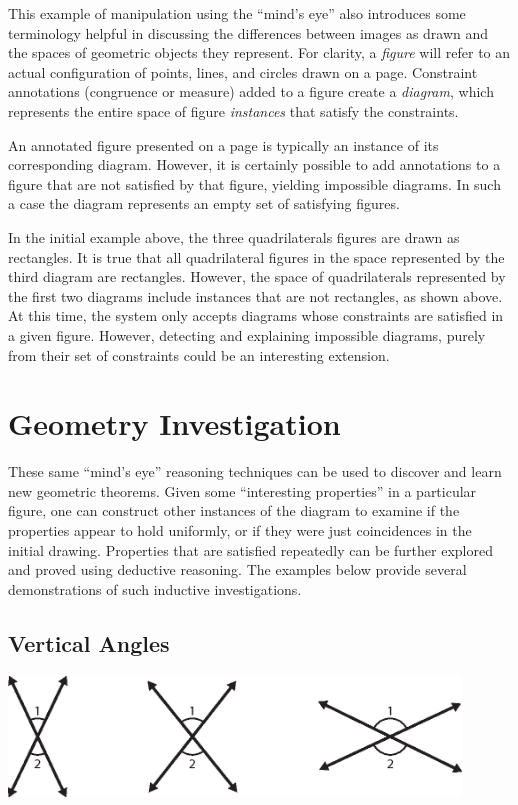 This example of manipulation using the ``mind's eye'' also introduces
some terminology helpful in discussing the differences between images
as drawn and the spaces of geometric objects they represent.  For
clarity, a \emph{figure} will refer to an actual configuration of
points, lines, and circles drawn on a page.  Constraint annotations
(congruence or measure) added to a figure create a \emph{diagram},
which represents the entire space of figure \emph{instances} that
satisfy the constraints.

An annotated figure presented on a page is typically an instance of
its corresponding diagram.  However, it is certainly possible to add
annotations to a figure that are not satisfied by that figure,
yielding impossible diagrams.  In such a case the diagram represents
an empty set of satisfying figures.

In the initial example above, the three quadrilaterals figures are
drawn as rectangles.  It is true that all quadrilateral figures in the
space represented by the third diagram are rectangles.  However, the
space of quadrilaterals represented by the first two diagrams include
instances that are not rectangles, as shown above.  At this time, the
system only accepts diagrams whose constraints are satisfied in a
given figure.  However, detecting and explaining impossible diagrams,
purely from their set of constraints could be an interesting
extension.

\section{Geometry Investigation}

These same ``mind's eye'' reasoning techniques can be used to discover
and learn new geometric theorems.  Given some ``interesting
properties'' in a particular figure, one can construct other instances
of the diagram to examine if the properties appear to hold uniformly,
or if they were just coincidences in the initial drawing.  Properties
that are satisfied repeatedly can be further explored and proved using
deductive reasoning.  The examples below provide several
demonstrations of such inductive investigations.

\subsection{Vertical Angles}

\begin{center}
\includegraphics[width=0.9\textwidth]{diagrams/vertical.eps}
\end{center}

